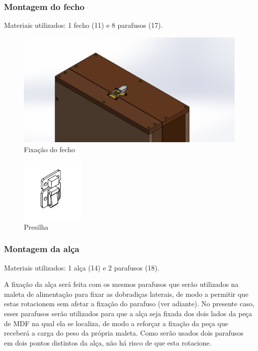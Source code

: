 \subsubsection{Montagem do fecho}

Materiais utilizados: 1 fecho (11) e 8 parafusos (17).


\begin{figure}[H]
    \centering
    \includegraphics[width=.7\textwidth]{Figuras/montagemMaletasEstrutura/controleFecho.png}
    \caption{Fixação do fecho}
    \label{fig:fechos}
\end{figure}

\begin{figure} [H]
    \centering
    \includegraphics[width=.3\textwidth]{Figuras/gcs/presilha.png}
    \caption{Presilha}
    \label{fig:presilha}
\end{figure}

\subsubsection{Montagem da alça}

Materiais utilizados: 1 alça (14) e 2 parafusos (18).

\par A fixação da alça será feita com os mesmos parafusos que serão utilizados na maleta de alimentação para fixar as dobradiças laterais, de modo a permitir que estas rotacionem sem afetar a fixação do parafuso (ver adiante). No presente caso, esses parafusos serão utilizados  para que a alça seja fixada dos dois lados da peça de MDF na qual ela se localiza, de modo a reforçar a fixação da peça que receberá a carga do peso da própria maleta. Como serão usados dois parafusos em dois pontos distintos da alça, não há risco de que esta rotacione.

